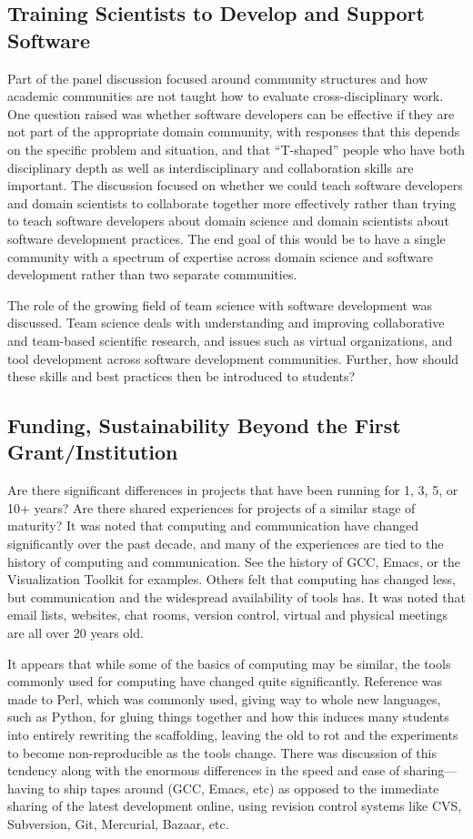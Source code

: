 \documentclass[11pt, oneside]{amsart}
\begin{document}
\subsection{Training Scientists to Develop and Support Software}
Part of the panel discussion focused around community structures and
how academic communities are not taught how to evaluate
cross-disciplinary work.  One question raised was whether software
developers can be effective if they are not part of the appropriate
domain community, with responses that this depends on the specific
problem and situation, and that ``T-shaped'' people who have both
disciplinary depth as well as interdisciplinary and collaboration
skills are important.  The discussion focused on whether we could
teach software developers and domain scientists to collaborate
together more effectively rather than trying to teach software
developers about domain science and domain scientists about software
development practices.  The end goal of this would be to have a single
community with a spectrum of expertise across domain science and
software development rather than two separate communities.

The role of the growing field of team science with software
development was discussed. Team science deals with understanding and
improving collaborative and team-based scientific research, and issues
such as virtual organizations, and tool development across software
development communities. Further, how should these skills and best
practices then be introduced to students?

\subsection{Funding, Sustainability Beyond the First Grant/Institution}

Are there significant differences in projects that have been running
for 1, 3, 5, or 10+ years? Are there shared experiences for projects
of a similar stage of maturity? It was noted that computing and
communication have changed significantly over the past decade, and
many of the experiences are tied to the history of computing and
communication. See the history of GCC, Emacs, or the Visualization
Toolkit for examples. Others felt that computing has changed less, but
communication and the widespread availability of tools has. It was
noted that email lists, websites, chat rooms, version control, virtual
and physical meetings are all over 20 years old.

It appears that while some of the basics of computing may be
similar, the tools commonly used for computing have changed quite
significantly. Reference was made to Perl, which was commonly used,
giving way to whole new languages, such as Python, for gluing things
together and how this induces many students into entirely rewriting
the scaffolding, leaving the old to rot and the experiments to become
non-reproducible as the tools change.  There was discussion of this
tendency along with the enormous differences in the speed and ease of
sharing---having to ship tapes around (GCC, Emacs, etc) as opposed to
the immediate sharing of the latest development online, using revision
control systems like CVS, Subversion, Git, Mercurial, Bazaar, etc.
\end{document}
